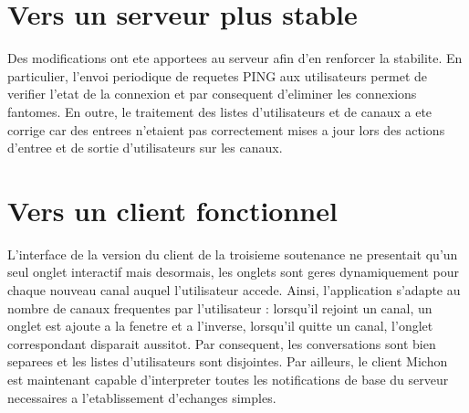 \section{Vers un serveur plus stable}

Des modifications ont ete apportees au serveur afin d'en renforcer la stabilite. En particulier, l'envoi periodique de requetes PING aux utilisateurs permet de verifier l'etat de la connexion et par consequent d'eliminer les connexions fantomes. En outre, le traitement des listes d'utilisateurs et de canaux a ete corrige car des entrees n'etaient pas correctement mises a jour lors des actions d'entree et de sortie d'utilisateurs sur les canaux.

\section{Vers un client fonctionnel}

L'interface de la version du client de la troisieme soutenance ne presentait qu'un seul onglet interactif mais desormais, les onglets sont geres dynamiquement pour chaque nouveau canal auquel l'utilisateur accede. Ainsi, l'application s'adapte au nombre de canaux frequentes par l'utilisateur : lorsqu'il rejoint un canal, un onglet est ajoute a la fenetre et a l'inverse, lorsqu'il quitte un canal, l'onglet correspondant disparait aussitot. Par consequent, les conversations sont bien separees et les listes d'utilisateurs sont disjointes. Par ailleurs, le client Michon est maintenant capable d'interpreter toutes les notifications de base du serveur necessaires a l'etablissement d'echanges simples.
